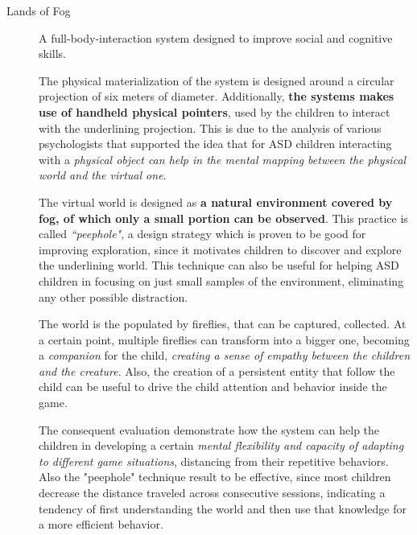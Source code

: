 \begin{description}
	\item[Lands of Fog] A full-body-interaction system \cite{mora-guiard_lands_2016} designed to improve social and cognitive skills. 
	
	The physical materialization of the system is designed around a circular projection of six meters of diameter.
	Additionally, \textbf{the systems makes use of handheld physical pointers}, used by the children to interact with the underlining projection.
	This is due to the analysis of various psychologists that supported the idea that for ASD children interacting with a \textit{physical object can help in the mental mapping between the physical world  and the virtual one}.
	
	The virtual world is designed as \textbf{a natural environment covered by fog, of which only a small portion can be observed}.
	This practice is called \textit{``peephole"}, a design strategy which is proven to be good \cite{dalsgaard_between_2014} for improving exploration, since it motivates children to discover and explore the underlining world.
	This technique can also be useful for helping ASD children in focusing on just small samples of the environment, eliminating any other possible distraction.
	
	The world is the populated by fireflies, that can be captured, collected.
	At a certain point, multiple fireflies can transform into a bigger one, becoming a \textit{companion} for the child, \textit{creating a sense of empathy between the children and the creature}.
	Also, the creation of a persistent entity that follow the child can be useful to drive the child attention and behavior inside the game.
	
	The consequent evaluation demonstrate how the system can help the children in developing a certain \textit{mental flexibility and capacity of adapting to different game situations}, distancing from their repetitive behaviors. 
	Also the "peephole" technique result to be effective, since most children decrease the distance traveled across consecutive sessions, indicating a tendency of first understanding the world and then use that knowledge for a more efficient behavior. 
\end{description}

